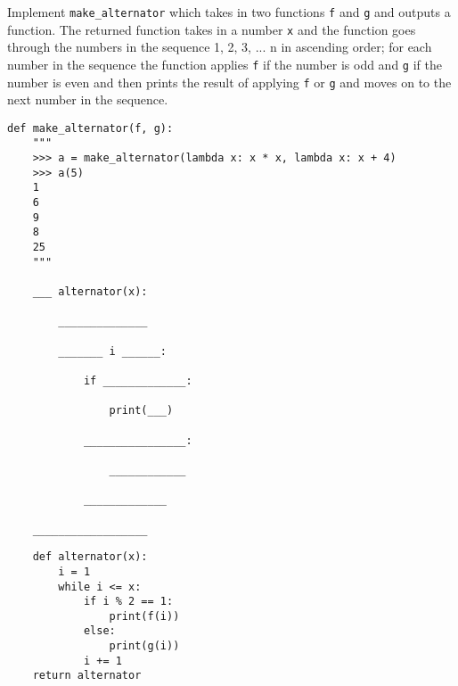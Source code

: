 \begin{blocksection}
\question Implement \lstinline$make_alternator$ which takes in two functions \texttt{f} and \texttt{g} and outputs a function. The returned function takes in a number \texttt{x} and the function goes through the numbers in the sequence {1, 2, 3, ... n} in ascending order; for each number in the sequence the function applies \texttt{f} if the number is odd and \texttt{g} if the number is even and then prints the result of applying \texttt{f} or \texttt{g} and moves on to the next number in the sequence.  

\begin{lstlisting}
def make_alternator(f, g):
    """
    >>> a = make_alternator(lambda x: x * x, lambda x: x + 4)
    >>> a(5)
    1
    6
    9
    8
    25
    """

    ___ alternator(x):

        ______________

        _______ i ______:

            if _____________:

                print(___)

            ________________:

                ____________

            _____________

    __________________

\end{lstlisting}

\begin{solution}[1.5in]
\begin{lstlisting}
    def alternator(x):
        i = 1
        while i <= x:
            if i % 2 == 1:
                print(f(i))
            else:
                print(g(i))
            i += 1
    return alternator
\end{lstlisting}
\end{solution}

\end{blocksection}